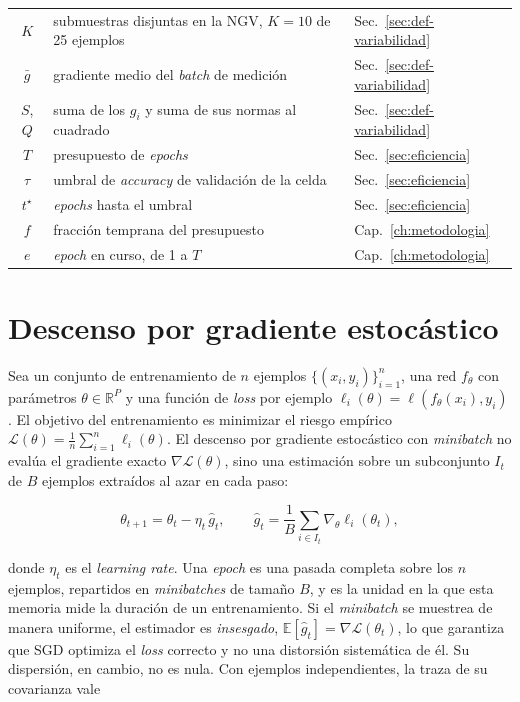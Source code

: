 \begin{table}[!ht]
\begin{tabular}{cll}
$K$                   & submuestras disjuntas en la NGV, $K = 10$ de 25 ejemplos & Sec.~\ref{sec:def-variabilidad} \\
$\bar{g}$             & gradiente medio del \emph{batch} de medición          & Sec.~\ref{sec:def-variabilidad} \\
$S$, $Q$              & suma de los $g_i$ y suma de sus normas al cuadrado & Sec.~\ref{sec:def-variabilidad} \\
$T$                   & presupuesto de \emph{epochs}                             & Sec.~\ref{sec:eficiencia} \\
$\tau$                & umbral de \emph{accuracy} de validación de la celda      & Sec.~\ref{sec:eficiencia} \\
$t^\star$             & \emph{epochs} hasta el umbral                            & Sec.~\ref{sec:eficiencia} \\
$f$                   & fracción temprana del presupuesto                 & Cap.~\ref{ch:metodologia} \\
$e$                   & \emph{epoch} en curso, de 1 a $T$                 & Cap.~\ref{ch:metodologia} \\
\bottomrule
\end{tabular}
\end{table}

\section{Descenso por gradiente estocástico}
\label{sec:sgd}

Sea un conjunto de entrenamiento de $n$ ejemplos $\{(x_i, y_i)\}_{i=1}^n$, una red $f_\theta$ con parámetros $\theta \in \mathbb{R}^P$ y una función de \emph{loss} por ejemplo $\ell_i(\theta) = \ell(f_\theta(x_i), y_i)$. El objetivo del entrenamiento es minimizar el riesgo empírico $\mathcal{L}(\theta) = \tfrac{1}{n}\sum_{i=1}^n \ell_i(\theta)$. El descenso por gradiente estocástico con \emph{minibatch} no evalúa el gradiente exacto $\nabla \mathcal{L}(\theta)$, sino una estimación sobre un subconjunto $I_t$ de $B$ ejemplos extraídos al azar en cada paso:

\begin{equation}
\theta_{t+1} = \theta_t - \eta_t\, \hat{g}_t,
\qquad
\hat{g}_t = \frac{1}{B}\sum_{i \in I_t} \nabla_\theta \ell_i(\theta_t),
\label{eq:sgd}
\end{equation}

donde $\eta_t$ es el \emph{learning rate}. Una \emph{epoch} es una pasada completa sobre los $n$ ejemplos, repartidos en \emph{minibatches} de tamaño $B$, y es la unidad en la que esta memoria mide la duración de un entrenamiento. Si el \emph{minibatch} se muestrea de manera uniforme, el estimador es \emph{insesgado}, $\mathbb{E}[\hat{g}_t] = \nabla \mathcal{L}(\theta_t)$, lo que garantiza que SGD optimiza el \emph{loss} correcto y no una distorsión sistemática de él. Su dispersión, en cambio, no es nula. Con ejemplos independientes, la traza de su covarianza vale

